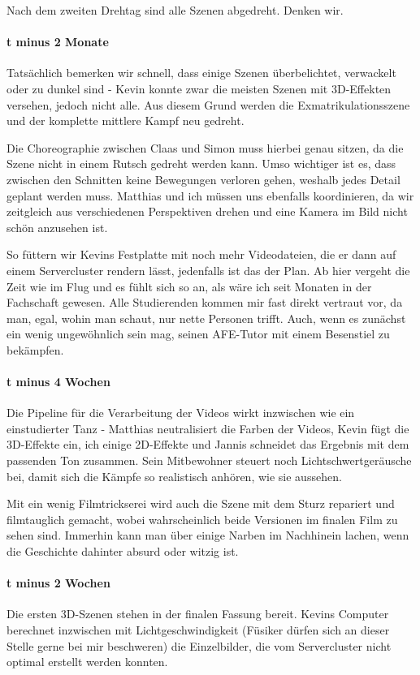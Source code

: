 {Nach dem zweiten Drehtag sind alle Szenen abgedreht. Denken wir.
\paragraph{t minus 2 Monate}
Tatsächlich bemerken wir schnell, dass einige Szenen überbelichtet,
verwackelt oder zu dunkel sind - Kevin konnte zwar die meisten Szenen mit
3D-Effekten versehen, jedoch nicht alle. Aus diesem Grund werden die
Exmatrikulationsszene und der komplette mittlere Kampf neu gedreht.


Die Choreographie zwischen Claas und Simon muss hierbei genau sitzen, da die
Szene nicht in einem Rutsch gedreht werden kann. Umso wichtiger ist es, dass
zwischen den Schnitten keine Bewegungen verloren gehen, weshalb jedes Detail
geplant werden muss. Matthias und ich müssen uns ebenfalls koordinieren, da
wir zeitgleich aus verschiedenen Perspektiven drehen und eine Kamera im Bild
nicht schön anzusehen ist.


So füttern wir Kevins Festplatte mit noch mehr Videodateien, die er dann auf
einem Servercluster rendern lässt, jedenfalls ist das der Plan.
Ab hier vergeht die Zeit wie im Flug und es fühlt sich so an, als wäre ich seit
Monaten in der Fachschaft gewesen. Alle Studierenden kommen mir fast direkt
vertraut vor, da man, egal, wohin man schaut, nur nette Personen trifft. Auch,
wenn es zunächst ein wenig ungewöhnlich sein mag, seinen AFE-Tutor mit einem
Besenstiel zu bekämpfen.
\paragraph{t minus 4 Wochen}
Die Pipeline für die Verarbeitung der Videos wirkt inzwischen wie ein
einstudierter Tanz - Matthias neutralisiert die Farben der Videos, Kevin fügt
die 3D-Effekte ein, ich einige 2D-Effekte und Jannis schneidet das Ergebnis mit
dem passenden Ton zusammen. Sein Mitbewohner steuert noch Lichtschwertgeräusche
bei, damit sich die Kämpfe so realistisch anhören, wie sie aussehen.


Mit ein wenig Filmtrickserei wird auch die Szene mit dem Sturz repariert und
filmtauglich gemacht, wobei wahrscheinlich beide Versionen im finalen Film zu
sehen sind. Immerhin kann man über einige Narben im Nachhinein lachen, wenn die
Geschichte dahinter absurd oder witzig ist.


\paragraph{t minus 2 Wochen}
Die ersten 3D-Szenen stehen in der finalen Fassung bereit. Kevins Computer
berechnet inzwischen mit Lichtgeschwindigkeit (Füsiker dürfen sich an dieser
Stelle gerne bei mir beschweren) die Einzelbilder, die vom Servercluster nicht
optimal erstellt werden konnten.


}
